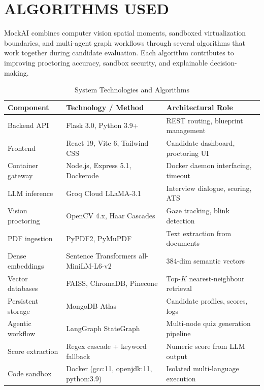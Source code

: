 \documentclass[12pt,a4paper]{report}
\begin{document}
\section{ALGORITHMS USED}

MockAI combines computer vision spatial moments, sandboxed virtualization boundaries,
and multi-agent graph workflows through several algorithms that work together during
candidate evaluation. Each algorithm contributes to improving proctoring accuracy,
sandbox security, and explainable decision-making.

\begin{table}[htbp]
  \centering
  \caption{System Technologies and Algorithms}
  \label{tab:technologies}
  \renewcommand{\arraystretch}{1.3}
  \begin{tabular}{p{3.5cm} p{4cm} p{5cm}}
    \toprule
    \textbf{Component} & \textbf{Technology / Method} & \textbf{Architectural Role} \\
    \midrule
    Backend API & Flask 3.0, Python 3.9+ & REST routing, blueprint management \\
    \addlinespace
    Frontend & React 19, Vite 6, Tailwind CSS & Candidate dashboard, proctoring UI \\
    \addlinespace
    Container gateway & Node.js, Express 5.1, Dockerode & Docker daemon interfacing, timeout \\
    \addlinespace
    LLM inference & Groq Cloud LLaMA-3.1 & Interview dialogue, scoring, ATS \\
    \addlinespace
    Vision proctoring & OpenCV 4.x, Haar Cascades & Gaze tracking, blink detection \\
    \addlinespace
    PDF ingestion & PyPDF2, PyMuPDF & Text extraction from documents \\
    \addlinespace
    Dense embeddings & Sentence Transformers all-MiniLM-L6-v2 & 384-dim semantic vectors \\
    \addlinespace
    Vector databases & FAISS, ChromaDB, Pinecone & Top-$K$ nearest-neighbour retrieval \\
    \addlinespace
    Persistent storage & MongoDB Atlas & Candidate profiles, scores, logs \\
    \addlinespace
    Agentic workflow & LangGraph StateGraph & Multi-node quiz generation pipeline \\
    \addlinespace
    Score extraction & Regex cascade + keyword fallback & Numeric score from LLM output \\
    \addlinespace
    Code sandbox & Docker (gcc:11, openjdk:11, python:3.9) & Isolated multi-language execution \\
    \bottomrule
  \end{tabular}
\end{table}
\end{document}
